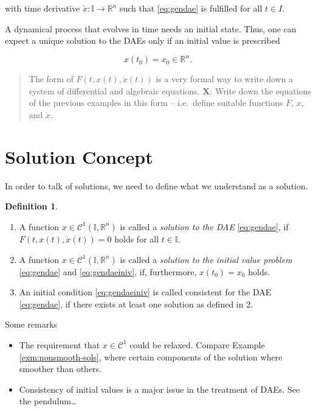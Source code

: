 \documentclass[]{book}
\providecommand{\tightlist}{%
  \setlength{\itemsep}{0pt}\setlength{\parskip}{0pt}}
\newenvironment {JHSAYS} [0] {\begin{quote}\color{jhsc}} {\end{quote}}
\theoremstyle{definition}
\newtheorem{definition}{Definition}[chapter]
\theoremstyle{definition}
\theoremstyle{definition}
\theoremstyle{remark}
\begin{document}
with time derivative \(\dot x \colon \mathbb I \to \mathbb R^{n}\) such that \eqref{eq:gendae} is fulfilled for all \(t\in I\).

A dynamical process that evolves in time needs an initial state. Thus, one can expect a unique solution to the DAEs only if an initial value is prescribed

\begin{equation}
    x(t_0) = x_0 \in \mathbb R^{n}. \label{eq:gendaeiniv} 
\end{equation}

\begin{JHSAYS}
The form of \(F(t, x(t), \dot x(t))\) is a very formal way to write down
a system of differential and algebraic equations. \textbf{X}: Write down
the equations of the previous examples in this form -- i.e.~define
suitable functions \(F\), \(x\), and \(\dot x\).
\end{JHSAYS}

\hypertarget{solution-concept}{%
\section{Solution Concept}\label{solution-concept}}

In order to talk of solutions, we need to define what we understand as a solution.

\begin{definition}
\protect\hypertarget{def:dae-solution}{}{\label{def:dae-solution} }\(\quad\)

\begin{enumerate}
\def\labelenumi{\arabic{enumi}.}
\item
  A function \(x \in \mathcal C^1(\mathbb I, \mathbb R^{n})\) is called a \emph{solution to the DAE} \eqref{eq:gendae}, if \(F(t, x(t), \dot x(t)) = 0\) holds for all \(t\in \mathbb I\).
\item
  A function \(x \in \mathcal C^1(\mathbb I, \mathbb R^{n})\) is called a \emph{solution to the initial value problem} \eqref{eq:gendae} and \eqref{eq:gendaeiniv}, if, furthermore, \(x(t_0)= x_0\) holds.
\item
  An initial condition \eqref{eq:gendaeiniv} is called consistent for the DAE \eqref{eq:gendae}, if there exists at least one solution as defined in 2.
\end{enumerate}
\end{definition}

Some remarks

\begin{itemize}
\tightlist
\item
  The requirement that \(x \in \mathcal C^1\) could be relaxed. Compare Example \ref{exm:nonsmooth-sols}, where certain components of the solution where smoother than others.
\item
  Consistency of initial values is a major issue in the treatment of DAEs. See the pendulum\ldots{}
\end{itemize}
\end{document}
